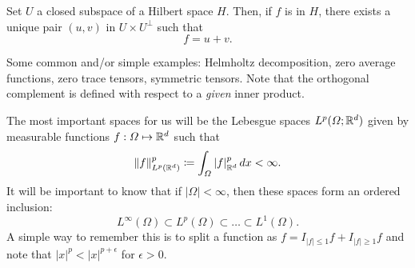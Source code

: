 \begin{theorem}\label{thm:orthogonal-decomposition} 
    Set $U$ a closed subspace of a Hilbert space $H$. Then, if $f$ is in $H$, there exists a unique pair $(u,v)$ in $U\times U^\perp$ such that 
        \begin{equation}\label{eq:orthogonal-decomposition} 
        f = u + v.
        \end{equation}
\end{theorem}
Some common and/or simple examples: Helmholtz decomposition, zero average functions, zero trace tensors, symmetric tensors. Note that the orthogonal complement is defined with respect to a \emph{given} inner product.\\


The most important spaces for us will be the Lebesgue spaces $L^p(\Omega;\mathbb{R}^d)$ given by measurable functions $f:\Omega \mapsto \mathbb{R}^d$ such that
\begin{equation}\label{eq:lebesgue-norm}
\|f\|_{L^p(\mathbb{R}^d)}^p \coloneqq \int_\Omega |f|_{\mathbb{R}^d}^p\,dx < \infty.
\end{equation}
It will be important to know that if $|\Omega|<\infty$, then these spaces form an ordered inclusion: 
    \begin{equation*}
    L^\infty(\Omega) \subset L^p(\Omega) \subset \dots \subset L^1(\Omega).
    \end{equation*}
A simple way to remember this is to split a function as $f = I_{|f|\leq 1}f + I_{|f|\geq 1}f$ and note that $|x|^p < |x|^{p+\epsilon}$ for $\epsilon > 0$. 

